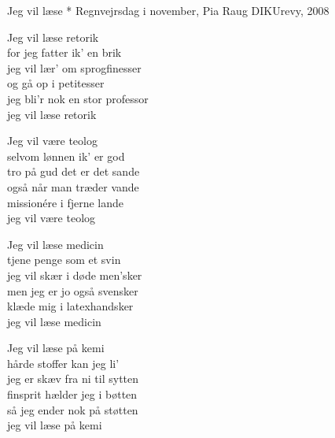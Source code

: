 \begin{song}{Jeg vil læse *}
  {} %
  {Regnvejrsdag i november, Pia Raug} %
  {} %
  {DIKUrevy, 2008} %
  {\NotCCLIed} %

  \begin{SBVerse}
    Jeg vil læse retorik\\
    for jeg fatter ik' en brik\\
    jeg vil lær' om sprogfinesser\\
    og gå op i petitesser\\
    jeg bli'r nok en stor professor\\
    jeg vil læse retorik
  \end{SBVerse}

  \begin{SBVerse}
    Jeg vil være teolog\\
    selvom lønnen ik' er god\\
    tro på gud det er det sande\\
    også når man træder vande\\
    missionére i fjerne lande\\
    jeg vil være teolog
  \end{SBVerse}

  \begin{SBVerse}
    Jeg vil læse medicin\\
    tjene penge som et svin\\
    jeg vil skær i døde men'sker\\
    men jeg er jo også svensker\\
    klæde mig i latexhandsker\\
    jeg vil læse medicin
  \end{SBVerse}

  \begin{SBVerse}
    Jeg vil læse på kemi\\
    hårde stoffer kan jeg li'\\
    jeg er skæv fra ni til sytten\\
    finsprit hælder jeg i bøtten\\
    så jeg ender nok på støtten\\
    jeg vil læse på kemi
  \end{SBVerse}


\end{song}
